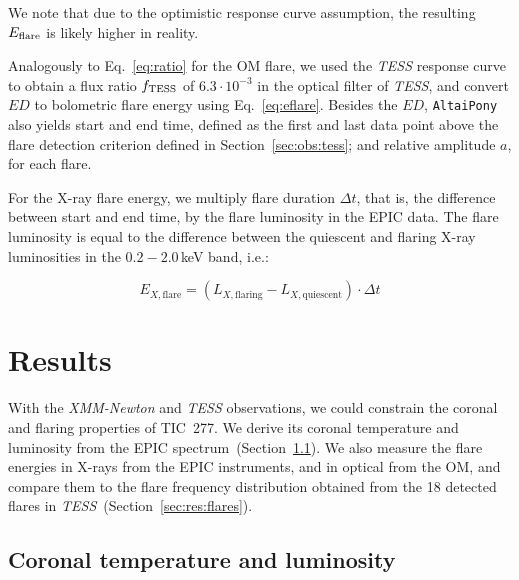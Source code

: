 \documentclass[twocolumn]{aastex631}
\begin{document}
We note that due to the optimistic response curve assumption, the resulting $E_{\rm flare}$ is likely higher in reality.


Analogously to Eq.~\ref{eq:ratio} for the OM flare, we used the \textit{TESS} response curve to obtain a flux ratio $f_{\rm TESS}$ of $6.3\cdot10^{-3}$ in the optical filter of \textit{TESS}, and convert $ED$ to bolometric flare energy using Eq.~\ref{eq:eflare}. Besides the $ED$, \texttt{AltaiPony} also yields start and end time, defined as the first and last data point above the flare detection criterion defined in Section~\ref{sec:obs:tess}; and relative amplitude $a$, for each flare.

For the X-ray flare energy, we multiply flare duration $\Delta t$, that is, the difference between start and end time, by the flare luminosity in the EPIC data. The flare luminosity is equal to the difference between the quiescent and flaring X-ray luminosities in the $0.2-2.0\,$keV band, i.e.:

\begin{equation}
    E_{X, \mathrm{flare}} = \left(L_{X,\mathrm{flaring}} -  L_{X,\mathrm{quiescent}}\right) \cdot \Delta t
    \label{eq:xrayflare}
\end{equation}

\section{Results}
\label{sec:results}
With the \textit{XMM-Newton} and \textit{TESS} observations, we could constrain the coronal and flaring properties of TIC~277. We derive its coronal temperature and luminosity from the EPIC spectrum~(Section~\ref{sec:res:XrayTL}). We also measure the flare energies in X-rays from the EPIC instruments, and in optical from the OM, and compare them to the flare frequency distribution obtained from the 18 detected flares in \textit{TESS}~(Section~\ref{sec:res:flares}).


\subsection{Coronal temperature and luminosity}
\label{sec:res:XrayTL}
\end{document}
